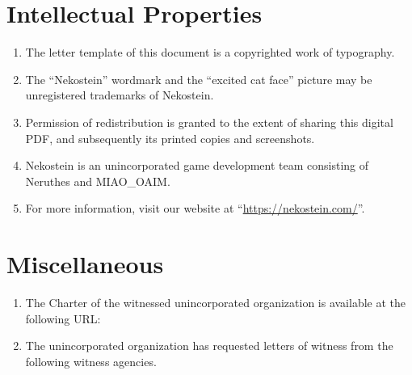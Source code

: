 \clearpage
\rmfamily\normalsize








\fakenewdoc
{}



\clearpage





\fakenewdoc
{}


\clearpage





\fakenewdoc
{}

\section{Intellectual Properties}
\begin{enumerate}
    \item The letter template of this document is a copyrighted work of typography.
    \item The ``Nekostein'' wordmark and the ``excited cat face'' picture may be unregistered trademarks of Nekostein.
    \item Permission of redistribution is granted to the extent of sharing this digital PDF,
        and subsequently its printed copies and screenshots.
    \item Nekostein is an unincorporated game development team consisting of Neruthes and MIAO\_OAIM.
    \item For more information, visit our website at ``\href{https://nekostein.com/}{https://nekostein.com/}''.
\end{enumerate}

\section{Miscellaneous}
\begin{enumerate}
    \item The Charter of the witnessed unincorporated organization is available at the following URL:\\
        
    \item The unincorporated organization has requested letters of witness from the following witness agencies.
    \begin{itemize}
        
    \end{itemize}
\end{enumerate}









